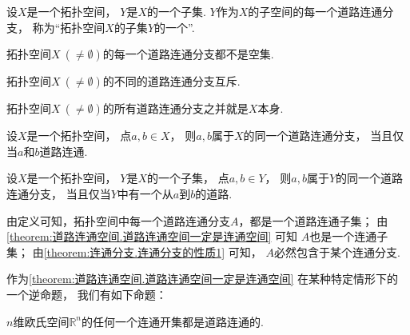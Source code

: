 \begin{definition}
设\(X\)是一个拓扑空间，
\(Y\)是\(X\)的一个子集.
\(Y\)作为\(X\)的子空间的每一个道路连通分支，
称为“拓扑空间\(X\)的子集\(Y\)的一个”.
\end{definition}

\begin{proposition}
拓扑空间\(X\ (\neq\emptyset)\)的每一个道路连通分支都不是空集.
\end{proposition}

\begin{proposition}
拓扑空间\(X\ (\neq\emptyset)\)的不同的道路连通分支互斥.
\end{proposition}

\begin{proposition}
拓扑空间\(X\ (\neq\emptyset)\)的所有道路连通分支之并就是\(X\)本身.
\end{proposition}

\begin{proposition}
设\(X\)是一个拓扑空间，
点\(a,b \in X\)，
则\(a,b\)属于\(X\)的同一个道路连通分支，
当且仅当\(a\)和\(b\)道路连通.
\end{proposition}

\begin{proposition}
设\(X\)是一个拓扑空间，
\(Y\)是\(X\)的一个子集，
点\(a,b \in Y\)，
则\(a,b\)属于\(Y\)的同一个道路连通分支，
当且仅当\(Y\)中有一个从\(a\)到\(b\)的道路.
\end{proposition}

由定义可知，拓扑空间中每一个道路连通分支\(A\)，都是一个道路连通子集；
由\cref{theorem:道路连通空间.道路连通空间一定是连通空间} 可知
\(A\)也是一个连通子集；
由\cref{theorem:连通分支.连通分支的性质1} 可知，
\(A\)必然包含于某个连通分支.

作为\cref{theorem:道路连通空间.道路连通空间一定是连通空间} 在某种特定情形下的一个逆命题，
我们有如下命题：
\begin{proposition}
\(n\)维欧氏空间\(\mathbb{R}^n\)的任何一个连通开集都是道路连通的.
\end{proposition}

